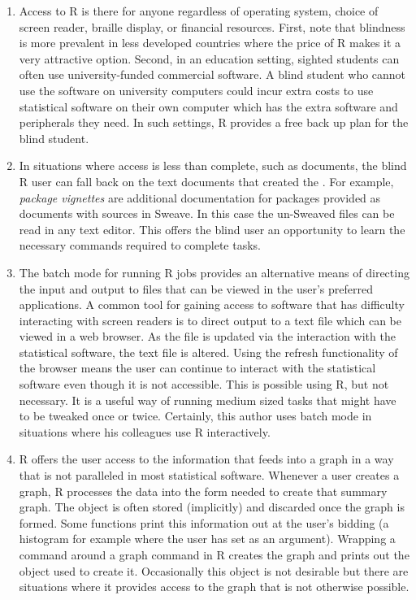 \begin{enumerate}
\item Access to R is there for anyone regardless of operating system, choice of screen reader, braille display,  or financial resources. First, note that blindness is more prevalent in less developed countries where the price of R makes it a very attractive option. Second, in an education setting,  sighted students can often use university-funded commercial software. A blind student who cannot use the software on university computers could incur extra costs to use statistical software on their own  computer which has the extra software and peripherals they need. In such settings, R provides a free back up plan for the blind student.

\item In situations where access is less than complete, such as \pdf{} documents, the blind R user can fall back on the text documents that created the \pdf{}. For example, \emph{package vignettes} are additional documentation for packages provided as \pdf{} documents with sources in Sweave. In this case the un-Sweaved files can be read in any text editor. This offers the blind user an opportunity to learn the necessary commands required to complete tasks.

\item The batch mode for running R jobs provides an alternative means of directing the input and output to files that can be viewed in the user's preferred applications. A common tool for gaining access to software that has difficulty interacting with screen readers is to direct output to  a text file which can be viewed in a web browser. As the file is updated via the interaction with the statistical software, the text file is altered. Using the refresh functionality of the browser means the user can continue to interact with the statistical software even though it is not accessible. This is possible using R, but not necessary. It is a useful way of running medium sized tasks that might have to be tweaked once or twice. Certainly, this author uses batch mode in situations where his colleagues use R interactively.

\item R offers the user access to the information that feeds into a graph in a way that is not paralleled in most statistical software. Whenever a user creates a graph, R processes the data into the form needed to create that summary graph. The object is often stored (implicitly) and discarded once the graph is formed. Some functions print this information out at the user's bidding (a histogram for example where the user has set  as an argument). Wrapping a  command around a graph command in R creates the graph and prints out the object used to create it. Occasionally this object is not desirable but there are situations where it provides access to the graph that is not otherwise possible.
\end{enumerate}


